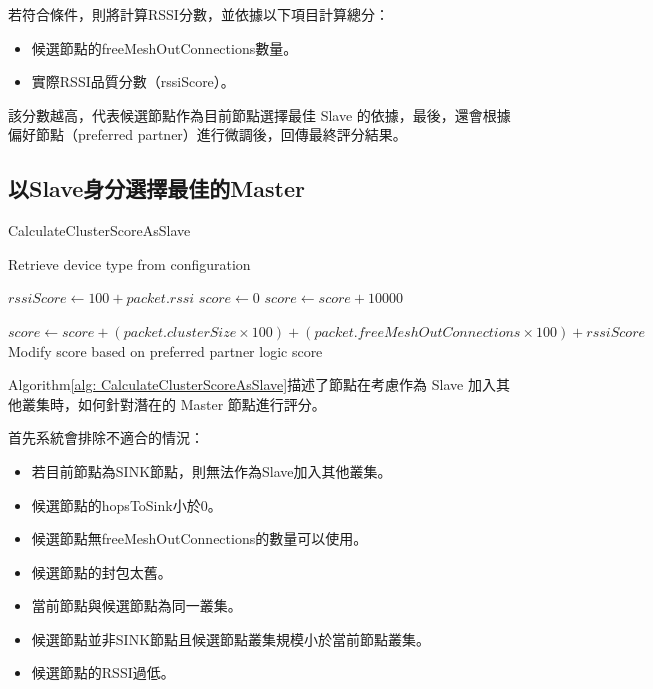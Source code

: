 \begin{ZhChapter}
若符合條件，則將計算RSSI分數，並依據以下項目計算總分：
\begin{itemize}
    \item 候選節點的freeMeshOutConnections數量。
    \item 實際RSSI品質分數（rssiScore）。
\end{itemize}

該分數越高，代表候選節點作為目前節點選擇最佳 Slave 的依據，最後，還會根據偏好節點（preferred partner）進行微調後，回傳最終評分結果。

\subsection{以Slave身分選擇最佳的Master}

\begin{algorithm}[H]
\caption{CalculateClusterScoreAsSlave}
\label{alg: CalculateClusterScoreAsSlave}
\begin{algorithmic}[1]
\State Retrieve device type from configuration
  \EndIf
{}  \EndIf
{}  \EndIf
{}  \EndIf
{}  \EndIf
{}  \EndIf
{}  \EndIf

\State $rssiScore \gets 100 + packet.rssi$
\State $score \gets 0$
    \State $score \gets score + 10000$
\EndIf

\State $score \gets score + (packet.clusterSize \times 100) + (packet.freeMeshOutConnections \times 100) + rssiScore$
\State Modify score based on preferred partner logic
\State \Return score
\end{algorithmic}
\end{algorithm}

Algorithm\ref{alg: CalculateClusterScoreAsSlave}描述了節點在考慮作為 Slave 加入其他叢集時，如何針對潛在的 Master 節點進行評分。

首先系統會排除不適合的情況：
\begin{itemize}
    \item 若目前節點為SINK節點，則無法作為Slave加入其他叢集。
    \item 候選節點的hopsToSink小於0。
    \item 候選節點無freeMeshOutConnections的數量可以使用。
    \item 候選節點的封包太舊。
    \item 當前節點與候選節點為同一叢集。
    \item 候選節點並非SINK節點且候選節點叢集規模小於當前節點叢集。
    \item 候選節點的RSSI過低。
\end{itemize}


\end{ZhChapter}
